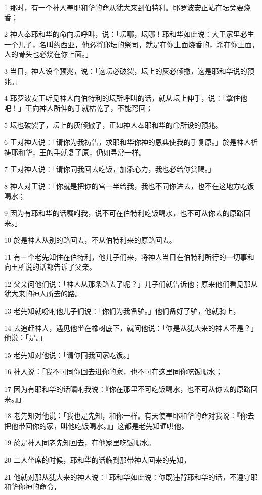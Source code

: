 \par 1 那时，有一个神人奉耶和华的命从犹大来到伯特利。耶罗波安正站在坛旁要烧香；
\par 2 神人奉耶和华的命向坛呼叫，说：「坛哪，坛哪！耶和华如此说：大卫家里必生一个儿子，名叫约西亚，他必将邱坛的祭司，就是在你上面烧香的，杀在你上面，人的骨头也必烧在你上面。」
\par 3 当日，神人设个预兆，说：「这坛必破裂，坛上的灰必倾撒，这是耶和华说的预兆。」
\par 4 耶罗波安王听见神人向伯特利的坛所呼叫的话，就从坛上伸手，说：「拿住他吧！」王向神人所伸的手就枯乾了，不能弯回；
\par 5 坛也破裂了，坛上的灰倾撒了，正如神人奉耶和华的命所设的预兆。
\par 6 王对神人说：「请你为我祷告，求耶和华你神的恩典使我的手复原。」於是神人祈祷耶和华，王的手就复了原，仍如寻常一样。
\par 7 王对神人说：「请你同我回去吃饭，加添心力，我也必给你赏赐。」
\par 8 神人对王说：「你就是把你的宫一半给我，我也不同你进去，也不在这地方吃饭喝水；
\par 9 因为有耶和华的话嘱咐我，说不可在伯特利吃饭喝水，也不可从你去的原路回来。」
\par 10 於是神人从别的路回去，不从伯特利来的原路回去。
\par 11 有一个老先知住在伯特利，他儿子们来，将神人当日在伯特利所行的一切事和向王所说的话都告诉了父亲。
\par 12 父亲问他们说：「神人从那条路去了呢？」儿子们就告诉他；原来他们看见那从犹大来的神人所去的路。
\par 13 老先知就吩咐他儿子们说：「你们为我备驴。」他们备好了驴，他就骑上，
\par 14 去追赶神人，遇见他坐在橡树底下，就问他说：「你是从犹大来的神人不是？」他说：「是。」
\par 15 老先知对他说：「请你同我回家吃饭。」
\par 16 神人说：「我不可同你回去进你的家，也不可在这里同你吃饭喝水；
\par 17 因为有耶和华的话嘱咐我说：『你在那里不可吃饭喝水，也不可从你去的原路回来。』」
\par 18 老先知对他说：「我也是先知，和你一样。有天使奉耶和华的命对我说：『你去把他带回你的家，叫他吃饭喝水。』」这都是老先知诓哄他。
\par 19 於是神人同老先知回去，在他家里吃饭喝水。
\par 20 二人坐席的时候，耶和华的话临到那带神人回来的先知，
\par 21 他就对那从犹大来的神人说：「耶和华如此说：你既违背耶和华的话，不遵守耶和华你神的命令，
